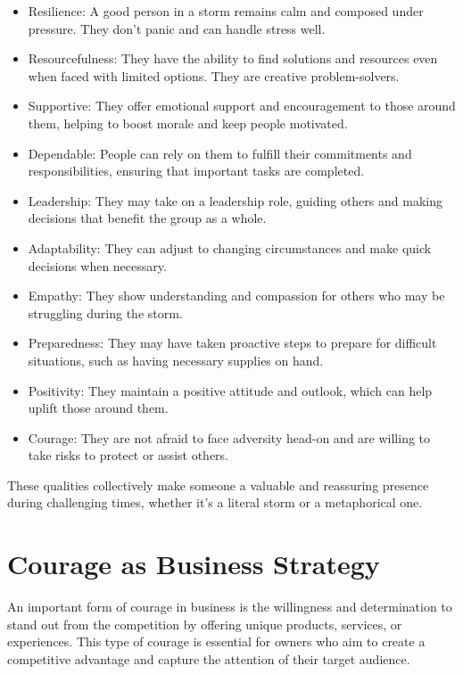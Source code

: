 \documentclass[
]{book}
\begin{document}
\begin{itemize}
\item
  Resilience: A good person in a storm remains calm and composed under pressure. They don't panic and can handle stress well.
\item
  Resourcefulness: They have the ability to find solutions and resources even when faced with limited options. They are creative problem-solvers.
\item
  Supportive: They offer emotional support and encouragement to those around them, helping to boost morale and keep people motivated.
\item
  Dependable: People can rely on them to fulfill their commitments and responsibilities, ensuring that important tasks are completed.
\item
  Leadership: They may take on a leadership role, guiding others and making decisions that benefit the group as a whole.
\item
  Adaptability: They can adjust to changing circumstances and make quick decisions when necessary.
\item
  Empathy: They show understanding and compassion for others who may be struggling during the storm.
\item
  Preparedness: They may have taken proactive steps to prepare for difficult situations, such as having necessary supplies on hand.
\item
  Positivity: They maintain a positive attitude and outlook, which can help uplift those around them.
\item
  Courage: They are not afraid to face adversity head-on and are willing to take risks to protect or assist others.
\end{itemize}

These qualities collectively make someone a valuable and reassuring presence during challenging times, whether it's a literal storm or a metaphorical one.

\hypertarget{courage-as-business-strategy}{%
\chapter{Courage as Business Strategy}\label{courage-as-business-strategy}}

An important form of courage in business is the willingness and determination to stand out from the competition by offering unique products, services, or experiences. This type of courage is essential for owners who aim to create a competitive advantage and capture the attention of their target audience.
\end{document}

